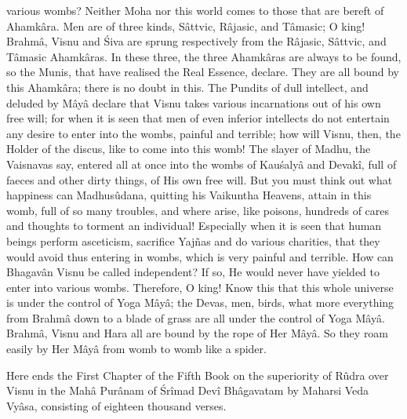 various wombs? Neither Moha nor this world comes to those that are bereft of Ahamk\^ara. Men are of three kinds, S\^attvic, R\^ajasic, and T\^amasic; O king! Brahm\^a, Visnu and \'Siva are sprung respectively from the R\^ajasic, S\^attvic, and T\^amasic Ahamk\^aras. In these three, the three Ahamk\^aras are always to be found, so the Munis, that have realised the Real Essence, declare. They are all bound by this Ahamk\^ara; there is no doubt in this. The Pundits of dull intellect, and deluded by M\^ay\^a declare that Visnu takes various incarnations out of his own free will; for when it is seen that men of even inferior intellects do not entertain any desire to enter into the wombs, painful and terrible; how will Visnu, then, the Holder of the discus, like to come into this womb! The slayer of Madhu, the Vaisnavas say, entered all at once into the wombs of Kau\'saly\^a and Devak\^i, full of faeces and other dirty things, of His own free will. But you must think out what happiness can Madhus\^udana, quitting his Vaikuntha Heavens, attain in this womb, full of so many troubles, and where arise, like poisons, hundreds of cares and thoughts to torment an individual! Especially when it is seen that human beings perform asceticism, sacrifice Yajñas and do various charities, that they would avoid thus entering in wombs, which is very painful and terrible. How can Bhagav\^an Visnu be called independent? If so, He would never have yielded to enter into various wombs. Therefore, O king! Know this that this whole universe is under the control of Yoga M\^ay\^a; the Devas, men, birds, what more everything from Brahm\^a down to a blade of grass are all under the control of Yoga M\^ay\^a. Brahm\^a, Visnu and Hara all are bound by the rope of Her M\^ay\^a. So they roam easily by Her M\^ay\^a from womb to womb like a spider.

Here ends the First Chapter of the Fifth Book on the superiority of R\^udra over Visnu in the Mah\^a Pur\^anam of \'Sr\^imad Dev\^i Bh\^agavatam by Maharsi Veda Vy\^asa, consisting of eighteen thousand verses.